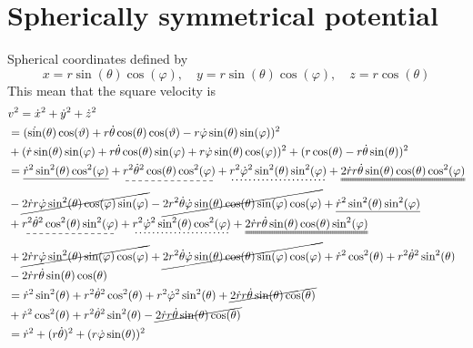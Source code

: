 \documentclass{article}
\begin{document}
    \section{Spherically symmetrical potential}
        Spherical coordinates defined by 
        \begin{equation*}
            x = r \sin(\theta) \cos(\varphi), \quad y = r \sin(\theta) \cos(\varphi), \quad z = r \cos(\theta)
        \end{equation*}
        This mean that the square velocity is 
        \begin{align*}
            &v^2 = \dot x^2 + \dot y^2 + \dot z^2 \\
            & = (\dot \sin(\theta) \cos(\vartheta) + r \dot \theta \cos(\theta) \cos(\vartheta) - r \dot \varphi \sin(\theta) \sin(\varphi))^2 \\
            & +  (\dot r \sin(\theta) \sin(\varphi) + r \dot \theta \cos(\theta) \sin(\varphi) + r \dot \varphi \sin(\theta)\cos(\varphi))^2 
            + (r \cos(\theta) - r \dot \theta \sin(\theta))^2 \\
            & = \underline{\dot r^2 \sin^2(\theta) \cos^2(\varphi)} + \dashuline{r^2 \dot \theta^2 \cos(\theta) \cos^2(\varphi)} + \dotuline{r^2 \dot \varphi^2 \sin^2(\theta) \sin^2(\varphi)} + \uuline{2 \dot r r \dot \theta \sin(\theta)\cos(\theta) \cos^2(\varphi)} \\
            & - \cancel{2 \dot r r \dot \varphi \sin^2(\theta) \cos(\varphi) \sin(\varphi)} - \cancel{2 r^2\dot \theta \dot \varphi \sin(\theta)\cos(\theta)\sin(\varphi)\cos(\varphi)} +  \underline{\dot r^2 \sin^2(\theta) \sin^2(\varphi)}  \\
            & + \dashuline{r^2 \dot \theta^2 \cos^2(\theta) \sin^2(\varphi)} + \dotuline{r^2 \dot \varphi^2 \sin^2(\theta) \cos^2(\varphi)} + \uuline{2 \dot r r \dot \theta \sin(\theta) \cos(\theta) \sin^2(\varphi)}\\
            &  + \cancel{2 \dot r r \dot \varphi \sin^2(\theta) \sin(\varphi) \cos(\varphi)}  + \cancel{2 r^2\dot \theta \dot \varphi \sin(\theta)\cos(\theta)\sin(\varphi)\cos(\varphi)}  + \dot r^2 \cos^2(\theta) + r^2 \dot \theta^2 \sin^2(\theta) \\
            & - 2 \dot r r \dot \theta \sin(\theta) \cos(\theta) \\
            & = \dot r^2 \sin^2(\theta) + r^2 \dot \theta^2 \cos^2(\theta) + r^2 \dot \varphi^2 \sin^2(\theta) + \cancel{2 \dot r r \dot \theta \sin(\theta)\cos(\theta)} \\
            &  + \dot r^2 \cos^2(\theta) + r^2 \dot \theta^2 \sin^2(\theta) - \cancel{2 \dot r r \dot \theta \sin(\theta) \cos(\theta) }\\
            & = \dot r^2 + (r \dot \theta)^2 + (r \dot \varphi \sin(\theta))^2
        \end{align*}
\end{document}
